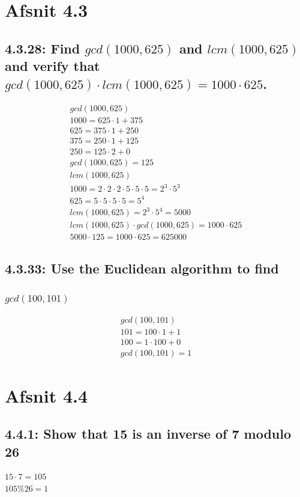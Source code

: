 \documentclass[12pt, a4paper]{report}
\begin{document}
			\section{Afsnit 4.3}
				\setcounter{subsection}{27}
				\subsection{4.3.28: Find $gcd(1000,625)$ and $lcm(1000,625)$ and verify that $gcd(1000,625)\cdot lcm(1000,625)=1000\cdot 625$.}
					\begin{align*}
						gcd(1000,625)\\
						1000 =  625\cdot 1 + 375\\
						625 = 375 \cdot 1 +250\\
						375=250\cdot 1 +125\\
						250 =125\cdot 2 +0\\
						gcd(1000,625)=125\\[4mm]
						lcm(1000,625)\\
						1000=2\cdot 2\cdot 2\cdot 5\cdot 5\cdot 5=2^3\cdot 5^3\\
						625=5\cdot 5\cdot 5\cdot 5=5^4\\
						lcm(1000,625)=2^3\cdot 5^4=5000\\[4mm]
						lcm(1000,625)\cdot gcd(1000,625)=1000\cdot 625\\
						5000\cdot 125=1000\cdot 625=625000
					\end{align*}
				\setcounter{subsection}{32}
				\subsection{4.3.33: Use the Euclidean algorithm to find}
					\setcounter{subsubsection}{1}
					\subsubsection{$gcd(100,101)$}
						\begin{align*}
							gcd(100,101)\\
							101 = 100\cdot 1 + 1\\
							100 = 1\cdot 100 + 0\\
							gcd(100,101)=1
						\end{align*}
			\section{Afsnit 4.4}
				\subsection{4.4.1: Show that 15 is an inverse of 7 modulo 26}
					$15\cdot 7=105$\\
					$105\% 26=1$
				\setcounter{subsection}{2}
\end{document}
